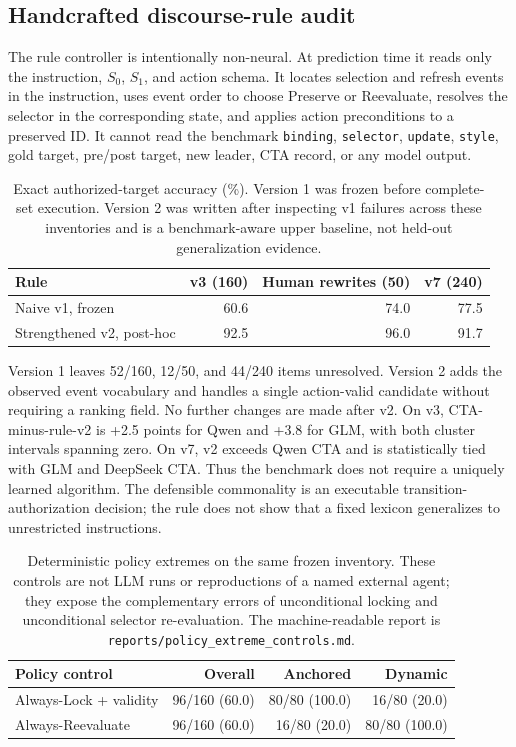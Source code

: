 \documentclass[10pt]{article}
\begin{document}
\subsection{Handcrafted discourse-rule audit}
The rule controller is intentionally non-neural. At prediction time it reads only the instruction,
$S_0$, $S_1$, and action schema. It locates selection and refresh events in the instruction,
uses event order to choose Preserve or Reevaluate, resolves the selector in the corresponding
state, and applies action preconditions to a preserved ID. It cannot read the benchmark
\texttt{binding}, \texttt{selector}, \texttt{update}, \texttt{style}, gold target, pre/post target,
new leader, CTA record, or any model output.

\begin{table}[h]
\centering
\small
\begin{tabular}{lrrr}
\toprule
Rule & v3 (160) & Human rewrites (50) & v7 (240)\\
\midrule
Naive v1, frozen & 60.6 & 74.0 & 77.5\\
Strengthened v2, post-hoc & 92.5 & 96.0 & 91.7\\
\bottomrule
\end{tabular}
\caption{Exact authorized-target accuracy (\%). Version 1 was frozen before complete-set
execution. Version 2 was written after inspecting v1 failures across these inventories and is a
benchmark-aware upper baseline, not held-out generalization evidence.}
\label{tab:supp-rule}
\end{table}

Version 1 leaves 52/160, 12/50, and 44/240 items unresolved. Version 2 adds the observed event
vocabulary and handles a single action-valid candidate without requiring a ranking field. No
further changes are made after v2. On v3, CTA-minus-rule-v2 is +2.5 points for Qwen and +3.8 for
GLM, with both cluster intervals spanning zero. On v7, v2 exceeds Qwen CTA and is statistically
tied with GLM and DeepSeek CTA. Thus the benchmark does not require a uniquely learned algorithm.
The defensible commonality is an executable transition-authorization decision; the rule does not
show that a fixed lexicon generalizes to unrestricted instructions.

\begin{table}[h]
\centering
\small
\begin{tabular}{lrrr}
\toprule
Policy control & Overall & Anchored & Dynamic \\
\midrule
Always-Lock + validity & 96/160 (60.0) & 80/80 (100.0) & 16/80 (20.0) \\
Always-Reevaluate & 96/160 (60.0) & 16/80 (20.0) & 80/80 (100.0) \\
\bottomrule
\end{tabular}
\caption{Deterministic policy extremes on the same frozen inventory. These controls are not
LLM runs or reproductions of a named external agent; they expose the complementary errors of
unconditional locking and unconditional selector re-evaluation. The machine-readable report
is \texttt{reports/policy\_extreme\_controls.md}.}
\end{table}
\end{document}
